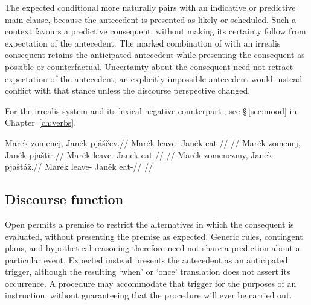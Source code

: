 The expected conditional  more naturally pairs with an indicative or
predictive main clause, because the antecedent is presented as likely or
scheduled. Such a context favours a predictive consequent, without making
its certainty follow from expectation of the antecedent. The marked
combination of  with an irrealis consequent retains
the anticipated antecedent while presenting the consequent as possible or
counterfactual. Uncertainty about the consequent need not retract expectation
of the antecedent; an explicitly impossible antecedent would instead conflict
with that stance unless the discourse perspective changed.

For the irrealis system and its lexical negative counterpart ,
see §\,\ref{sec:mood} in Chapter~\ref{ch:verbs}.

\pex \label{ex:cond-irr}
\a
\begingl
\gla Marėk zomenej, Janėk pjáščev.//
\glb Marėk leave-\Cond{} Janėk eat-\Irr{}//
\glft {} //
\endgl
\a
\begingl
\gla Marėk zomenej, Janėk pjaštir.//
\glb Marėk leave-\Cond{} Janėk eat-\NIrr{}//
\glft {} //
\endgl
\a
\begingl
\gla Marėk zomenezmy, Janėk pjaštáž.//
\glb Marėk leave-\ECond{} Janėk eat-\Ctpl{}//
\glft {} //
\endgl
\xe

\subsection{Discourse function}\label{sec:cond-discourse}

Open  permits a premise to restrict the alternatives in which the
consequent is evaluated, without presenting the premise as expected. Generic
rules, contingent plans, and hypothetical reasoning therefore need not share a
prediction about a particular event. Expected  instead presents the
antecedent as an anticipated trigger, although the resulting `when' or `once'
translation does not assert its occurrence. A procedure may accommodate that
trigger for the purposes of an instruction, without guaranteeing that the
procedure will ever be carried out.

